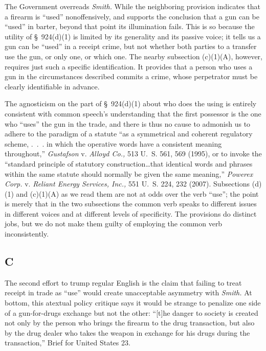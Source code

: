  The Government overreads \emph{Smith.} While the neighboring provision
indicates that a firearm is ``used'' nonoffensively, and supports the
conclusion that a gun can be ``used'' in barter, beyond that point
its illumination fails. This is so because the utility of \S~924(d)(1)
is limited by its generality and its passive voice; it tells us a gun
can be ``used'' in a receipt crime, but not whether both parties to a
transfer use the gun, or only one, or which one. The nearby subsection
(c)(1)(A), however, requires just such a specific identification. It
provides that a person who uses a gun in the circumstances described
commits a crime, whose perpetrator must be clearly identifiable in
advance.

  The agnosticism on the part of \S~924(d)(1) about who does the using
is entirely consistent with common speech's understanding that the
first possessor is the one who ``uses'' the gun in the trade, and
there is thus no cause to admonish us to adhere to the paradigm of a
statute ``as a symmetrical and coherent regulatory scheme, .~.~.
in which the operative words have a consistent meaning throughout,''
\emph{Gustafson} v. \emph{Alloyd Co.,} 513 U.~S. 561, 569 (1995), or to
invoke the ``standard principle of statutory construction\dots that
identical words and phrases within the same statute should normally
be given the same meaning,'' \emph{Powerex Corp.} v. \emph{Reliant Energy
Services, Inc.,} 551 U.~S. 224, 232 (2007). Subsections \newpage 
(d)(1) and (c)(1)(A) as we read them are not at odds over the verb
``use''; the point is merely that in the two subsections the common
verb speaks to different issues in different voices and at different
levels of specificity. The provisions do distinct jobs, but we do not
make them guilty of employing the common verb inconsistently.\footnotemark[9]

\subsection{C}

  The second effort to trump regular English is the claim that failing
to treat receipt in trade as ``use'' would create unacceptable
asymmetry with \emph{Smith.} At bottom, this atextual policy critique says
it would be strange to penalize one side of a gun-for-drugs exchange but
not the other: ``[t]he danger to society is created not only by the
person who brings the firearm to the drug transaction, but also by the
drug dealer who takes the weapon in exchange for his drugs during the
transaction,'' Brief for United States 23.

